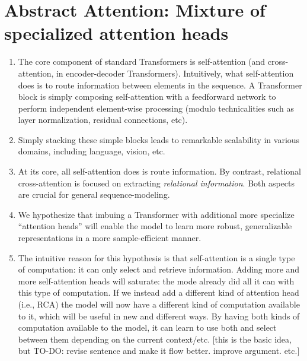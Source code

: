 \section{Abstract Attention: Mixture of specialized attention heads}

\begin{enumerate}
  \item The core component of standard Transformers is self-attention (and cross-attention, in encoder-decoder Transformers). Intuitively, what self-attention does is to route information between elements in the sequence. A Transformer block is simply composing self-attention with a feedforward network to perform independent element-wise processing (modulo technicalities such as layer normalization, residual connections, etc).
  \item Simply stacking these simple blocks leads to remarkable scalability in various domains, including language, vision, etc.
  \item At its core, all self-attention does is route information. By contrast, relational cross-attention is focused on extracting \textit{relational information}. Both aspects are crucial for general sequence-modeling.
  \item We hypothesize that imbuing a Transformer with additional more specialize ``attention heads'' will enable the model to learn more robust, generalizable representations in a more sample-efficient manner.
  \item The intuitive reason for this hypothesis is that self-attention is a single type of computation: it can only select and retrieve information. Adding more and more self-attention heads will saturate: the mode already did all it can with this type of computation. If we instead add a different kind of attention head (i.e., RCA) the model will now have a different kind of computation available to it, which will be useful in new and different ways. By having both kinds of computation available to the model, it can learn to use both and select between them depending on the current context/etc. [this is the basic idea, but TO-DO: revise sentence and make it flow better. improve argument. etc.]
\end{enumerate}